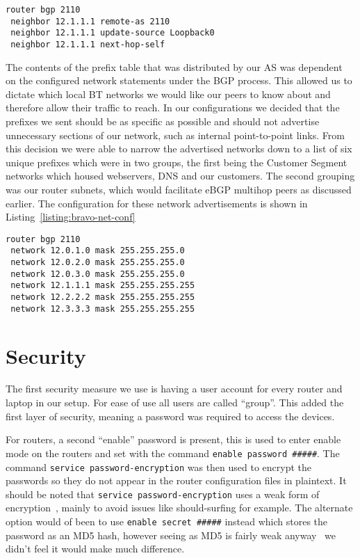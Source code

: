 \begin{lstlisting}[caption={Bravo-Alpha iBGP Configuration}, label={listing:bravo-ibgp-conf}]
router bgp 2110
 neighbor 12.1.1.1 remote-as 2110
 neighbor 12.1.1.1 update-source Loopback0
 neighbor 12.1.1.1 next-hop-self
\end{lstlisting}

The contents of the prefix table that was distributed by our AS was dependent
on the configured network statements under the BGP process. This allowed us to
dictate which local BT networks we would like our peers to know about and
therefore allow their traffic to reach. In our configurations we decided that
the prefixes we sent should be as specific as possible and should not advertise
unnecessary sections of our network, such as internal point-to-point links.
From this decision we were able to narrow the advertised networks down to a
list of six unique prefixes which were in two groups, the first being the
Customer Segment networks which housed webservers, DNS and our customers. The
second grouping was our router subnets, which would facilitate eBGP multihop
peers as discussed earlier. The configuration for these network advertisements
is shown in Listing~\ref{listing:bravo-net-conf}

\begin{lstlisting}[caption={Bravo BGP Network Configuration}, label={listing:bravo-net-conf}]
router bgp 2110
 network 12.0.1.0 mask 255.255.255.0
 network 12.0.2.0 mask 255.255.255.0
 network 12.0.3.0 mask 255.255.255.0
 network 12.1.1.1 mask 255.255.255.255
 network 12.2.2.2 mask 255.255.255.255
 network 12.3.3.3 mask 255.255.255.255
\end{lstlisting}

\section{Security}
The first security measure we use is having a user account for every router and
laptop in our setup. For ease of use all users are called ``group''. This added
the first layer of security,  meaning a password was required to access the
devices.

For routers, a second ``enable'' password is present, this is used to enter
enable mode on the routers and set with the command \texttt{enable password
\#\#\#\#\#}. The command \texttt{service password-encryption} was then used to
encrypt the passwords so they do not appear in the router configuration files
in plaintext. It should be noted that \texttt{service password-encryption} uses
a weak form of encryption~\cite{ciscocracker}, mainly to avoid issues like
should-surfing for example. The alternate option would of been to use
\texttt{enable secret \#\#\#\#\#} instead which stores the password as an MD5
hash, however seeing as MD5 is fairly weak anyway~\cite{md5} we didn't feel it
would make much difference.

